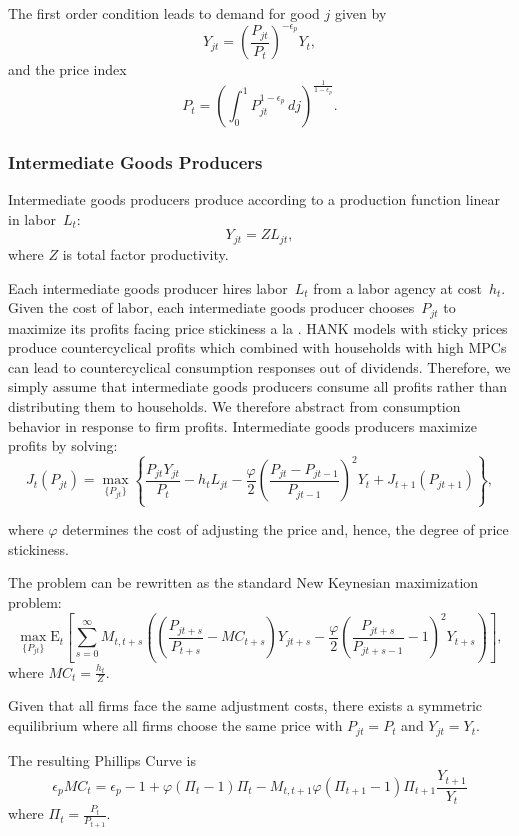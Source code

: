 \documentclass[\econtexRoot/HAFiscal]{subfiles}
\begin{document}
The first order condition leads to demand for good $j$ given by
$$Y_{jt} = \left(\frac {P_{jt}}{P_{t}}\right)^{- \epsilon_{p}} Y_{t},$$
and the price index
$$P_{t} = \left(\int_{0}^{1} P_{jt}^{1-\epsilon_{p}}\,dj \right )^{\frac{1}{1-\epsilon_{p}}}.$$


\subsubsection{Intermediate Goods Producers}

Intermediate goods producers produce according to a production function linear in labor~$L_{t}$: 
$$Y_{jt} =  Z L_{jt},$$ 
where $Z$ is total factor productivity.
  
Each intermediate goods producer hires labor~$L_{t}$ from a labor agency at cost~$h_{t}$. Given the cost of labor, each intermediate goods producer chooses~$P_{jt}$ to maximize its profits facing price stickiness a la \cite{Rotemberg1982}. HANK models with sticky prices produce countercyclical profits which combined with households with high MPCs can lead to countercyclical consumption responses out of dividends. Therefore, we simply assume that intermediate goods producers consume all profits rather than distributing them to households. We therefore abstract from consumption behavior in response to firm profits. Intermediate goods producers maximize profits by solving:
$$J_{t}\left(P_{jt}\right) = \max_{\{P_{jt}\}} \left\{\frac{P_{jt}Y_{jt}}{P_{t}} - h_{t} L_{jt} -  \frac{\varphi}{2}\left( \frac{P_{jt} - P_{jt-1}}{P_{jt-1}} \right)^{2} Y_{t}  + J_{t+1}\left(P_{jt+1}\right) \right\},$$ 

where $\varphi$ determines the cost of adjusting the price and, hence, the degree of price stickiness. 

The problem can be rewritten as the standard New Keynesian maximization problem:
$$\max_{\{P_{jt}\}} \mathrm{E}_{t}\left[\sum_{s=0}^{\infty}  M_{t,t+s} \left( \left( \frac{P_{jt+s}}{P_{t+s}} - MC_{t+s}\right)Y_{jt+s} -  \frac{\varphi}{2}\left( \frac{P_{jt+s}}{P_{jt+s-1}} - 1\right)^{2} Y_{t+s} \right)\right],$$ 
where $MC_{t} = \frac{h_{t}}{Z}$.

Given that all firms face the same adjustment costs, there exists a symmetric equilibrium where all firms choose the same price with $P_{jt}=P_{t}$ and $Y_{jt}=Y_{t}$.

The resulting Phillips Curve is
$$ \epsilon_{p} MC_{t} = \epsilon_{p} - 1 + \varphi ( \Pi_{t} -1) \Pi_{t} - M_{t,t+1} \varphi (\Pi_{t+1} -1 ) \Pi_{t+1} \frac{Y_{t+1}}{Y_{t}}$$
where $\Pi_{t} = \frac{P_{t}}{P_{t+1}}$. 
\end{document}
